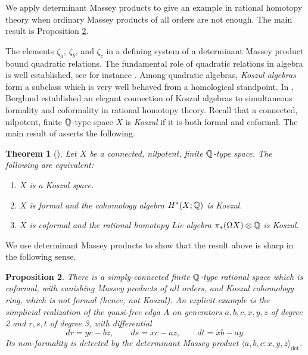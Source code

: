 \documentclass[11pt]{article}
\newtheorem{theorem}{Theorem}[section]
\newtheorem{proposition}[theorem]{Proposition}
\theoremstyle{definition}
\theoremstyle{definition}
\begin{document}
We apply determinant Massey products to give an example in rational homotopy theory 
when ordinary Massey products of all orders are not enough.
The main result is Proposition \ref{prop: berglund space}.

\smallskip


The elements $\zeta_a$, $\zeta_b$,
and $\zeta_c$ in a defining system of a determinant Massey product bound quadratic relations.
The fundamental role of quadratic relations in algebra is well established,
see for instance  \cite{Quadraticalgebras}. Among quadratic algebras,
\emph{Koszul algebras} form a subclass which is very well behaved from a homological standpoint.
In \cite{Berglund-KoszulSpaces}, Berglund established an elegant connection of Koszul
algebras to simultaneous formality and coformality in rational homotopy theory.
Recall that a connected, nilpotent, finite ${\mathbb{Q}}$-type space $X$ is \emph{Koszul}
if it is both formal and coformal.
The main result of \cite{Berglund-KoszulSpaces} asserts the following.

\begin{theorem}[{\cite[Thm. 1.2]{Berglund-KoszulSpaces}}]
Let $X$ be a connected, nilpotent, finite ${\mathbb{Q}}$-type space. The following are equivalent:
\begin{enumerate}
    \item $X$ is a Koszul space.
    \item $X$ is formal and the cohomology algebra $H^*(X;{\mathbb{Q}})$ is Koszul.
    \item $X$ is coformal and the rational homotopy Lie algebra $\pi_*(\Omega X)\otimes {\mathbb{Q}}$ is Koszul.
\end{enumerate}
\end{theorem}

We use determinant Massey products to show that the result above is sharp in the 
following sense.




\begin{proposition}
\label{prop: berglund space}
There is a simply-connected finite ${\mathbb{Q}}$-type rational space which is coformal,
with vanishing Massey products of all orders, and Koszul cohomology ring, which is not formal (hence, not Koszul).
An explicit example is the simplicial realization of the quasi-free cdga $A$ on generators $a,b,c,x,y,z$ of degree 2
and $r,s,t$ of degree 3, with differential
\[
 dr=yc-bz,\qquad ds=xc-az,\qquad dt=xb-ay.
\]
Its non-formality
is detected by the determinant Massey product
$\langle a,b,c : x,y,z \rangle_{\det}$.
\end{proposition}
\end{document}
